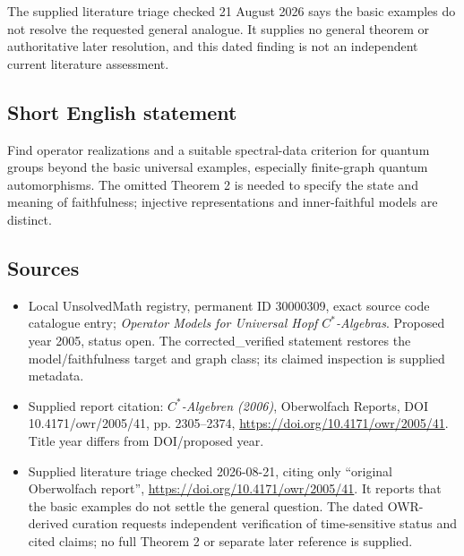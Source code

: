 \documentclass[11pt]{article}
\begin{document}
The supplied literature triage checked 21 August 2026 says the basic examples do not resolve the requested general analogue. It supplies no general theorem or authoritative later resolution, and this dated finding is not an independent current literature assessment.
\subsection{Short English statement}
Find operator realizations and a suitable spectral-data criterion for quantum groups beyond the basic universal examples, especially finite-graph quantum automorphisms. The omitted Theorem 2 is needed to specify the state and meaning of faithfulness; injective representations and inner-faithful models are distinct.
\subsection{Sources}
\begin{itemize}
\item Local UnsolvedMath registry, permanent ID 30000309, exact source code catalogue entry; \emph{Operator Models for Universal Hopf $C^*$-Algebras}. Proposed year 2005, status open. The corrected\_verified statement restores the model/faithfulness target and graph class; its claimed inspection is supplied metadata.
\item Supplied report citation: \emph{$C^*$-Algebren (2006)}, Oberwolfach Reports, DOI 10.4171/owr/2005/41, pp. 2305--2374, \url{https://doi.org/10.4171/owr/2005/41}. Title year differs from DOI/proposed year.
\item Supplied literature triage checked 2026-08-21, citing only ``original Oberwolfach report'', \url{https://doi.org/10.4171/owr/2005/41}. It reports that the basic examples do not settle the general question. The dated OWR-derived curation requests independent verification of time-sensitive status and cited claims; no full Theorem 2 or separate later reference is supplied.
\end{itemize}
\end{document}
